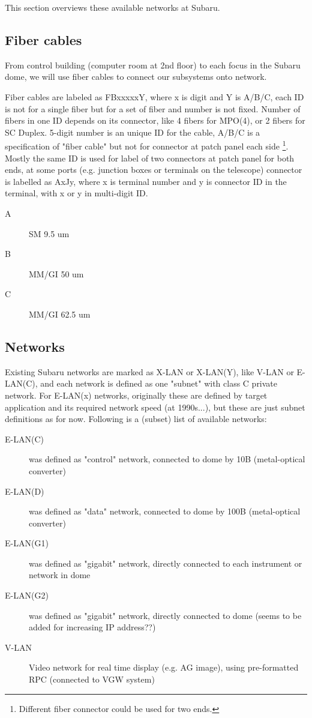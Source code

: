 \documentclass[a4paper,notitlepage]{article}
\begin{document}
This section overviews these available networks at Subaru. 

\subsection{Fiber cables}

From control building (computer room at 2nd floor) to each focus in the 
Subaru dome, we will use fiber cables to connect our subsystems onto network. 

Fiber cables are labeled as FBxxxxxY, where x is digit and Y is A/B/C, 
each ID is not for a single fiber but for a set of fiber and number is not 
fixed. Number of fibers in one ID depends on its connector, like 4 fibers for 
MPO(4), or 2 fibers for SC Duplex. 
5-digit number is an unique ID for the cable, A/B/C is a specification of 
"fiber cable" but not for connector at patch panel each side
\footnote{Different fiber connector could be used for two ends.}.
Mostly the same ID is used for label of two connectors at patch panel for both 
ends, at some ports (e.g. junction boxes or terminals on the telescope) 
connector is labelled as AxJy, where x is terminal number and y is 
connector ID in the terminal, with x or y in multi-digit ID. 

\begin{description}
  \item[A] SM 9.5 um
  \item[B] MM/GI 50 um 
  \item[C] MM/GI 62.5 um
\end{description}

\subsection{Networks}

Existing Subaru networks are marked as X-LAN or X-LAN(Y), like V-LAN or 
E-LAN(C), and each network is defined as one "subnet" with class C private 
network. 
For E-LAN(x) networks, originally these are defined by target application 
and its required network speed (at 1990s...), but these are just subnet 
definitions as for now. 
Following is a (subset) list of available networks: 

\begin{description}
  \item[E-LAN(C)] was defined as "control" network, connected to dome by 10B 
    (metal-optical converter)
  \item[E-LAN(D)] was defined as "data" network, connected to dome by 100B 
    (metal-optical converter)
  \item[E-LAN(G1)] was defined as "gigabit" network, directly connected to 
    each instrument or network in dome
  \item[E-LAN(G2)] was defined as "gigabit" network, directly connected to 
    dome (seems to be added for increasing IP address??)
  \item[V-LAN] Video network for real time display (e.g. AG image),
    using pre-formatted RPC (connected to VGW system)
\end{description}
\end{document}
